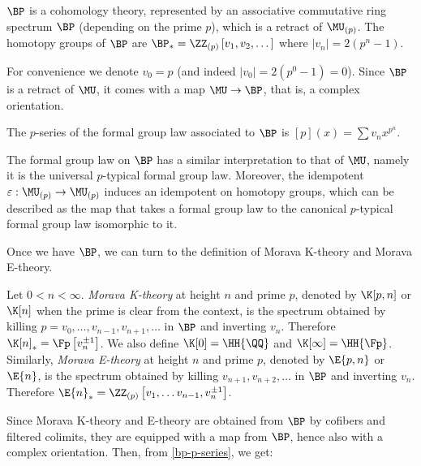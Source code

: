 \begin{theorem}
	$\BP$ is a cohomology theory, represented by an associative commutative ring spectrum $\BP$ (depending on the prime $p$), which is a retract of $\MU_{\left(p\right)}$.
	The homotopy groups of $\BP$ are $\BP_* = \ZZ_{\left(p\right)}\left[v_1, v_2, \dotsc\right]$ where $\left|v_n\right| = 2\left(p^n-1\right)$.
\end{theorem}

For convenience we denote $v_0 = p$ (and indeed $\left|v_0\right| = 2\left(p^0-1\right) = 0$).
Since $\BP$ is a retract of $\MU$, it comes with a map $\MU \to \BP$, that is, a complex orientation.

\begin{proposition}\label{bp-p-series}
	The $p$-series of the formal group law associated to $\BP$ is
	$\left[p\right]\left(x\right) = \sum v_n x^{p^n}$.
\end{proposition}

\begin{remark}
	The formal group law on $\BP$ has a similar interpretation to that of $\MU$, namely it is the universal $p$-typical formal group law.
	Moreover, the idempotent $\varepsilon: \MU_{\left(p\right)} \to \MU_{\left(p\right)}$ induces an idempotent on homotopy groups, which can be described as the map that takes a formal group law to the canonical $p$-typical formal group law isomorphic to it.
\end{remark}

Once we have $\BP$, we can turn to the definition of Morava K-theory and Morava E-theory.

\begin{definition}
	Let $0 < n < \infty$.
	\emph{Morava K-theory} at height $n$ and prime $p$, denoted by $\K[p,n]$ or $\K[n]$ when the prime is clear from the context, is the spectrum obtained by killing $p=v_0, \dotsc, v_{n-1}, v_{n+1}, \dotsc$ in $\BP$ and inverting $v_n$.
	Therefore $\K[n]_* = \Fp\left[v_n^{\pm 1}\right]$.
	We also define $\K[0] = \HH{\QQ}$ and $\K[\infty] = \HH{\Fp}$.
	Similarly, \emph{Morava E-theory} at height $n$ and prime $p$, denoted by $\E{p,n}$ or $\E{n}$, is the spectrum obtained by killing $v_{n+1}, v_{n+2}, \dotsc$ in $\BP$ and inverting $v_n$.
	Therefore $\E{n}_* = \ZZ_{\left(p\right)}\left[v_1, \dotsc v_{n-1}, v_n^{\pm 1}\right]$.
\end{definition}

Since Morava K-theory and E-theory are obtained from $\BP$ by cofibers and filtered colimits, they are equipped with a map from $\BP$, hence also with a complex orientation.
Then, from \ref{bp-p-series}, we get:

